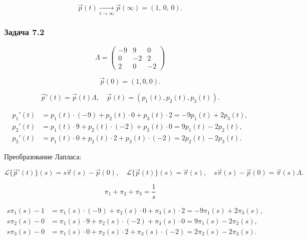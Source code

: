 \[
	\vec{p}(t)\xrightarrow[t\to\infty]{}\vec{p}(\infty)=\left(1,\,0,\,0\right).
\]

\subsubsection*{Задача 7.2}




\[
	\Lambda =
	\begin{pmatrix}
		-9 & 9  & 0  \\
		0  & -2 & 2  \\
		2  & 0  & -2
	\end{pmatrix}
\]

\[
	\vec{p}(0) = (1,0,0).
\]

\[
	\vec{p}'(t) = \vec{p}(t)\Lambda,\quad \vec{p}(t)=(p_1(t),p_2(t),p_3(t)).
\]

\[
	\begin{aligned}
		p_1'(t) & =  p_1 (t)\cdot(-9) + p_2(t)\cdot 0 + p_3(t)\cdot 2 = -9p_1(t)+2p_3(t), \\
		p_2'(t) & =  p_1 (t)\cdot 9 + p_2(t)\cdot(-2) + p_3(t)\cdot 0 = 9p_1(t)-2p_2(t),  \\
		p_3'(t) & =  p_1 (t)\cdot 0 + p_2(t)\cdot 2 + p_3(t)\cdot(-2) = 2p_2(t)-2p_3(t).
	\end{aligned}
\]

Преобразование Лапласа:

\[
	\mathcal{L}\{\vec p'(t)\}(s)=s \vec \pi(s)-\vec p(0)
	,\quad
	\mathcal{L}\{\vec p(t)\}(s)=\vec \pi(s)
	,\quad
	s \vec \pi(s)-\vec p(0)=\vec \pi(s)\Lambda.
\]

\[
	\pi_1+\pi_2+\pi_3=\frac{1}{s}
\]

\[
	\begin{aligned}
		s \pi_1(s)-1 & = \pi_1(s)\cdot(-9) + \pi_2(s)\cdot 0 + \pi_3(s)\cdot 2 = -9\pi_1(s)+2\pi_3(s), \\
		s \pi_2(s)-0 & = \pi_1(s)\cdot 9 + \pi_2(s)\cdot(-2) + \pi_3(s)\cdot 0 = 9\pi_1(s)-2\pi_2(s),  \\
		s \pi_3(s)-0 & = \pi_1(s)\cdot 0 + \pi_2(s)\cdot 2 + \pi_3(s)\cdot(-2) = 2\pi_2(s)-2\pi_3(s).
	\end{aligned}
\]

